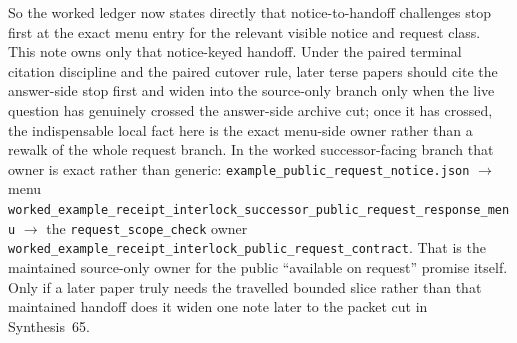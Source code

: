 \documentclass[11pt]{article}
\begin{document}
So the worked ledger now states directly that notice-to-handoff challenges stop first at the exact menu entry for the relevant visible notice and request class. This note owns only that notice-keyed handoff. Under the paired terminal citation discipline and the paired cutover rule, later terse papers should cite the answer-side stop first and widen into the source-only branch only when the live question has genuinely crossed the answer-side archive cut; once it has crossed, the indispensable local fact here is the exact menu-side owner rather than a rewalk of the whole request branch.\cite{series:pairedterminalcitationdiscipline,series:pairedterminalcutoverrules} In the worked successor-facing branch that owner is exact rather than generic: \nolinkurl{example_public_request_notice.json} $\to$ menu \nolinkurl{worked_example_receipt_interlock_successor_public_request_response_menu} $\to$ the \nolinkurl{request_scope_check} owner \nolinkurl{worked_example_receipt_interlock_public_request_contract}. That is the maintained source-only owner for the public ``available on request'' promise itself. Only if a later paper truly needs the travelled bounded slice rather than that maintained handoff does it widen one note later to the packet cut in Synthesis~65.
\end{document}
